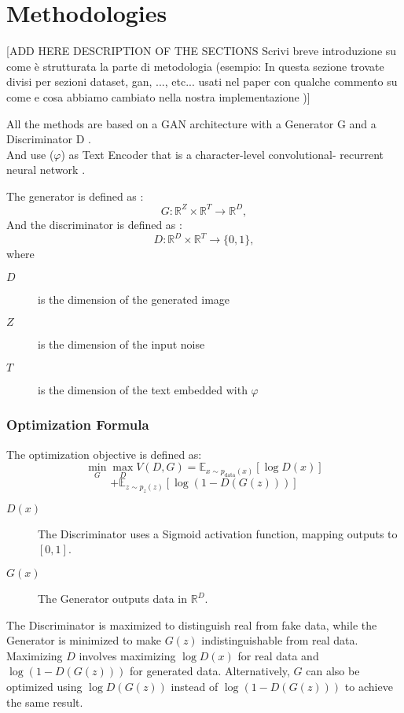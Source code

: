 \section*{ Methodologies }
[ADD HERE DESCRIPTION OF THE SECTIONS Scrivi breve introduzione su come è 
strutturata la parte di metodologia (esempio: In questa sezione trovate divisi per sezioni dataset, 
gan, ..., etc... usati nel paper con qualche commento su come e cosa abbiamo cambiato nella nostra implementazione )]

All the methods are based on a GAN architecture with a Generator G 
and a Discriminator D . \\ 
And use ($\varphi$) as Text Encoder that is a character-level convolutional-
recurrent neural network .

The generator is defined as :
\[
G : \mathbb{R}^Z \times \mathbb{R}^{T} \rightarrow \mathbb{R}^D,
\]
And the discriminator is defined as :  
\[
D : \mathbb{R}^D \times \mathbb{R}^{T} \rightarrow \{0, 1\},
\]
where 
\begin{description}
    \item[${D}$] is the dimension of the generated image
    \item[${Z}$] is the dimension of the input noise
    \item[${T}$] is the dimension of the text embedded with $\varphi$
\end{description}


\subsubsection*{Optimization Formula}
The optimization objective is defined as:  
\begin{equation}
    \min_{G} \max_{D} V(D, G) = \mathbb{E}_{x \sim p_{\text{data}}(x)}[\log D(x)] 
\end{equation}
\[
+ \mathbb{E}_{z \sim p_z(z)}[\log(1 - D(G(z)))]
\]
\begin{description}
    \item[$D(x)$] The Discriminator uses a Sigmoid activation function, mapping outputs to $[0, 1]$.
    \item[$G(x)$] The Generator outputs data in $\mathbb{R}^D$.
\end{description}


The Discriminator is maximized to distinguish real from fake data, 
while the Generator is minimized to make $G(z)$ indistinguishable from real data.  
Maximizing $D$ involves maximizing $\log D(x)$ for real data and $\log(1 - D(G(z)))$ for generated data.  
Alternatively, $G$ can also be optimized using $\log D(G(z))$ instead of $\log(1 - D(G(z)))$ to achieve the same result.


